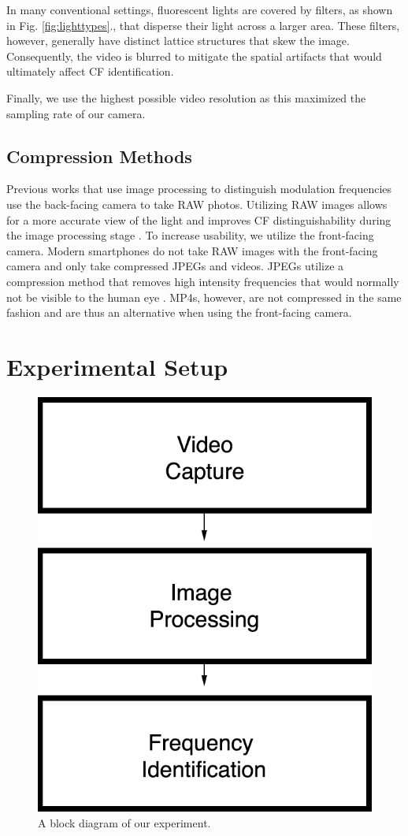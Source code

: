 \documentclass[conference]{IEEEtran}
\begin{document}
In many conventional settings, fluorescent lights are covered by filters, as shown in Fig. \ref{fig:lighttypes}., that disperse their light across a larger area. These filters, however, generally have distinct lattice structures that skew the image. Consequently, the video is blurred to mitigate the spatial artifacts that would ultimately affect CF identification. 

Finally, we use the highest possible video resolution as this maximized the sampling rate of our camera. 

\subsection{Compression Methods}\label{section:compression}

Previous works that use image processing to distinguish modulation frequencies use the back-facing camera to take RAW photos. Utilizing RAW images allows for a more accurate view of the light and improves CF distinguishability during the image processing stage \cite{zhang2016litell}. To increase usability, we utilize the front-facing camera. Modern smartphones do not take RAW images with the front-facing camera and only take compressed JPEGs and videos. JPEGs utilize a compression method that removes high intensity frequencies that would normally not be visible to the human eye \cite{wallace1992jpeg}. MP4s, however, are not compressed in the same fashion and are thus an alternative when using the front-facing camera.

\section{Experimental Setup}\label{section:experimentalsetup}

\begin{figure}
\centerline{\includegraphics[width=0.5\columnwidth]{figures/block.jpg}}
	\caption{A block diagram of our experiment.}
	\label{fig:block}
\end{figure}
\end{document}
